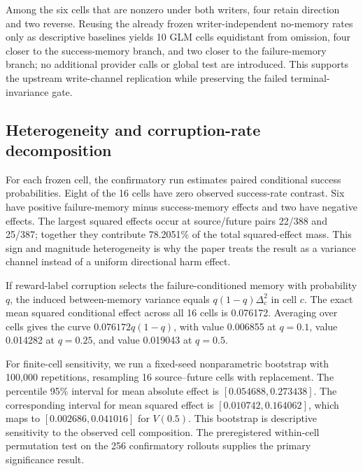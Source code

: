 Among the six cells that are nonzero under both writers, four retain direction and two reverse. Reusing the already frozen writer-independent no-memory rates only as descriptive baselines yields 10 GLM cells equidistant from omission, four closer to the success-memory branch, and two closer to the failure-memory branch; no additional provider calls or global test are introduced. This supports the upstream write-channel replication while preserving the failed terminal-invariance gate.

\subsection{Heterogeneity and corruption-rate decomposition}
For each frozen cell, the confirmatory run estimates paired conditional success probabilities. Eight of the 16 cells have zero observed success-rate contrast. Six have positive failure-memory minus success-memory effects and two have negative effects. The largest squared effects occur at source/future pairs 22/388 and 25/387; together they contribute 78.2051\% of the total squared-effect mass. This sign and magnitude heterogeneity is why the paper treats the result as a variance channel instead of a uniform directional harm effect.

If reward-label corruption selects the failure-conditioned memory with probability $q$, the induced between-memory variance equals $q(1-q)\Delta_c^2$ in cell $c$. The exact mean squared conditional effect across all 16 cells is 0.076172. Averaging over cells gives the curve $0.076172q(1-q)$, with value 0.006855 at $q=0.1$, value 0.014282 at $q=0.25$, and value 0.019043 at $q=0.5$.

For finite-cell sensitivity, we run a fixed-seed nonparametric bootstrap with 100,000 repetitions, resampling 16 source--future cells with replacement. The percentile 95\% interval for mean absolute effect is $[0.054688,0.273438]$. The corresponding interval for mean squared effect is $[0.010742,0.164062]$, which maps to $[0.002686,0.041016]$ for $V(0.5)$. This bootstrap is descriptive sensitivity to the observed cell composition. The preregistered within-cell permutation test on the 256 confirmatory rollouts supplies the primary significance result.


